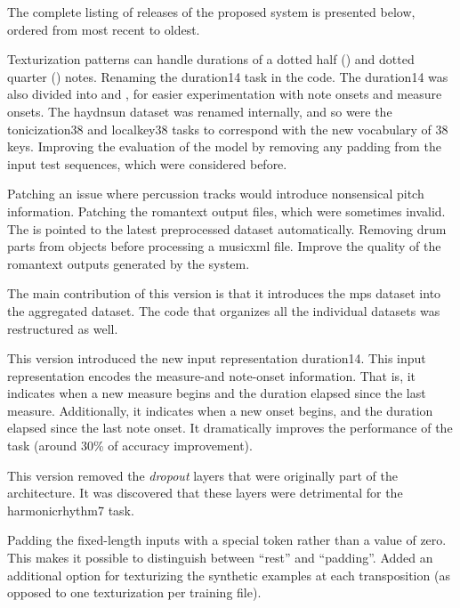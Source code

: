 The complete listing of releases of the proposed system is
presented below, ordered from most recent to oldest.

Texturization patterns can handle durations of a dotted half
(\musHalfDotted) and dotted quarter (\musQuarterDotted)
notes. Renaming the \gls{duration14} task in the code. The
\gls{duration14} was also divided into 
and , for easier experimentation with note
onsets and measure onsets. The \gls{haydnsun} dataset was
renamed internally, and so were the \gls{tonicization38} and
\gls{localkey38} tasks to correspond with the new vocabulary
of 38 keys. Improving the evaluation of the model by
removing any padding from the input test sequences, which
were considered before.

Patching an issue where percussion tracks would introduce
nonsensical pitch information. Patching the \gls{romantext}
output files, which were sometimes invalid. The
 is pointed to the latest preprocessed dataset
automatically. Removing drum parts from
 objects before processing a
\gls{musicxml} file. Improve the quality of the
\gls{romantext} outputs generated by the system.

The main contribution of this version is that it introduces
the \gls{mps} dataset into the aggregated dataset. The code
that organizes all the individual datasets was restructured
as well. 

This version introduced the new input representation
\gls{duration14}. This input representation encodes the
measure-and note-onset information. That is, it indicates
when a new measure begins and the duration elapsed since the
last measure. Additionally, it indicates when a new onset
begins, and the duration elapsed since the last note onset.
It dramatically improves the performance of the
 task (around 30\% of accuracy
improvement).

This version removed the \emph{dropout} layers
\parencite{dahl2013improving} that were originally part of
the architecture. It was discovered that these layers were
detrimental for the \gls{harmonicrhythm7} task.

Padding the fixed-length inputs with a special token rather
than a value of zero. This makes it possible to distinguish
between ``rest'' and ``padding''. Added an additional option
for texturizing the synthetic examples at each transposition
(as opposed to one texturization per training file).

